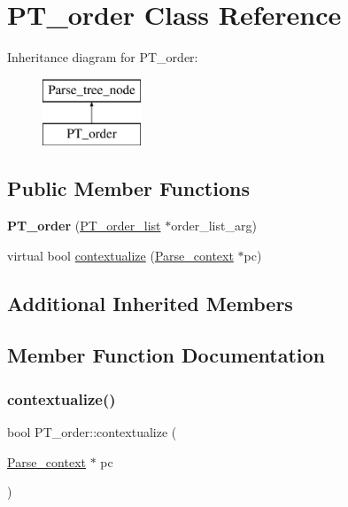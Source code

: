 \hypertarget{classPT__order}{}\section{P\+T\+\_\+order Class Reference}
\label{classPT__order}
Inheritance diagram for P\+T\+\_\+order\+:\begin{figure}[H]
\begin{center}
\leavevmode
\includegraphics[height=2.000000cm]{classPT__order}
\end{center}
\end{figure}
\subsection*{Public Member Functions}
\begin{DoxyCompactItemize}
\item 
\mbox{\label{classPT__order_ac7ca371484383eddaeee77a1c572aae8}} 
{\bfseries P\+T\+\_\+order} (\mbox{\hyperlink{classPT__order__list}{P\+T\+\_\+order\+\_\+list}} $\ast$order\+\_\+list\+\_\+arg)
\item 
virtual bool \mbox{\hyperlink{classPT__order_a2de0120e90aacfc37332ff97fe4d9593}{contextualize}} (\mbox{\hyperlink{structParse__context}{Parse\+\_\+context}} $\ast$pc)
\end{DoxyCompactItemize}
\subsection*{Additional Inherited Members}


\subsection{Member Function Documentation}
\mbox{\label{classPT__order_a2de0120e90aacfc37332ff97fe4d9593}} 
\subsubsection{\texorpdfstring{contextualize()}{contextualize()}}
{\footnotesize\ttfamily bool P\+T\+\_\+order\+::contextualize (\begin{DoxyParamCaption}\item[{\mbox{\hyperlink{structParse__context}{Parse\+\_\+context}} $\ast$}]{pc }\end{DoxyParamCaption})\hspace{0.3cm}{\ttfamily [virtual]}}

